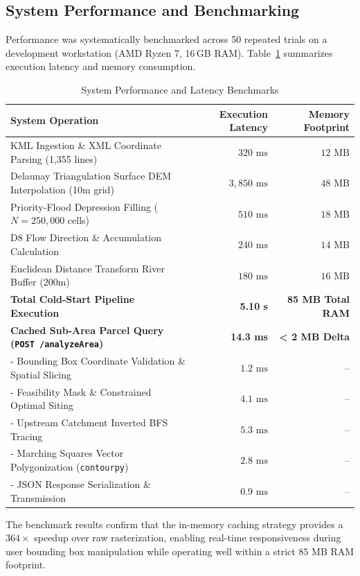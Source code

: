 \documentclass[manuscript,screen,review]{acmart}
\begin{document}
\subsection{System Performance and Benchmarking}
Performance was systematically benchmarked across 50 repeated trials on a development workstation (AMD Ryzen 7, 16\,GB RAM). Table~\ref{tab:benchmarks} summarizes execution latency and memory consumption.

\begin{table}[htb]
  \caption{System Performance and Latency Benchmarks}
  \label{tab:benchmarks}
  \footnotesize
  \renewcommand{\arraystretch}{0.90}
  \begin{tabular}{lrr}
    \toprule
    System Operation & Execution Latency & Memory Footprint \\
    \midrule
    KML Ingestion \& XML Coordinate Parsing (1,355 lines) & $320\text{ ms}$ & $12\text{ MB}$ \\
    Delaunay Triangulation Surface DEM Interpolation (10m grid) & $3,850\text{ ms}$ & $48\text{ MB}$ \\
    Priority-Flood Depression Filling ($N = 250,000$ cells) & $510\text{ ms}$ & $18\text{ MB}$ \\
    D8 Flow Direction \& Accumulation Calculation & $240\text{ ms}$ & $14\text{ MB}$ \\
    Euclidean Distance Transform River Buffer (200m) & $180\text{ ms}$ & $16\text{ MB}$ \\
    \textbf{Total Cold-Start Pipeline Execution} & \textbf{5.10 s} & \textbf{85 MB Total RAM} \\
    \midrule
    \textbf{Cached Sub-Area Parcel Query (\texttt{POST /analyzeArea})} & \textbf{14.3 ms} & \textbf{< 2 MB Delta} \\
    - Bounding Box Coordinate Validation \& Spatial Slicing & $1.2\text{ ms}$ & -- \\
    - Feasibility Mask \& Constrained Optimal Siting & $4.1\text{ ms}$ & -- \\
    - Upstream Catchment Inverted BFS Tracing & $5.3\text{ ms}$ & -- \\
    - Marching Squares Vector Polygonization (\texttt{contourpy}) & $2.8\text{ ms}$ & -- \\
    - JSON Response Serialization \& Transmission & $0.9\text{ ms}$ & -- \\
    \bottomrule
  \end{tabular}
\end{table}

The benchmark results confirm that the in-memory caching strategy provides a $364\times$ speedup over raw rasterization, enabling real-time responsiveness during user bounding box manipulation while operating well within a strict $85\text{ MB}$ RAM footprint.
\end{document}

